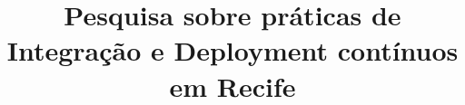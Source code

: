 \documentclass[sigconf]{acmart}
\begin{document}
\title{Pesquisa sobre práticas de Integração e Deployment contínuos em Recife}








\end{document}
